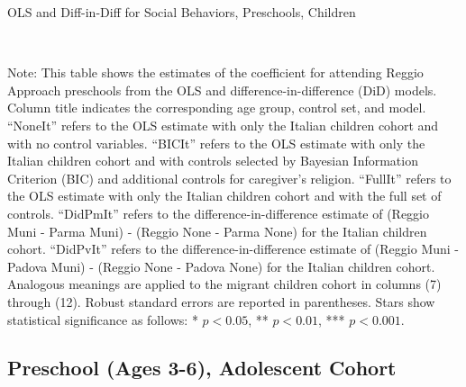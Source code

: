 \begin{landscape}
\begin{table}[H] \caption{OLS and Diff-in-Diff for Social Behaviors, Preschools, Children} \label{ols-H-reg}
\scalebox{0.77}{
}
\vspace{1ex} \\
\footnotesize\raggedright{Note: This table shows the estimates of the coefficient for attending Reggio Approach preschools from the OLS and difference-in-difference (DiD) models. Column title indicates the corresponding age group, control set, and model. ``NoneIt'' refers to the OLS estimate with only the Italian children cohort and with no control variables. ``BICIt'' refers to the OLS estimate with only the Italian children cohort and with controls selected by Bayesian Information Criterion (BIC) and additional controls for caregiver's religion. ``FullIt'' refers to the OLS estimate with only the Italian children cohort and with the full set of controls. ``DidPmIt'' refers to the difference-in-difference estimate of (Reggio Muni - Parma Muni) - (Reggio None - Parma None) for the Italian children cohort. ``DidPvIt'' refers to the difference-in-difference estimate of (Reggio Muni - Padova Muni) - (Reggio None - Padova None) for the Italian children cohort.  Analogous meanings are applied to the migrant children cohort in columns (7) through (12). Robust standard errors are reported in parentheses. Stars show statistical significance as follows: * $p < 0.05$, ** $p < 0.01$, *** $p < 0.001$.}
\end{table}
\end{landscape}






\subsection{Preschool (Ages 3-6), Adolescent Cohort}

